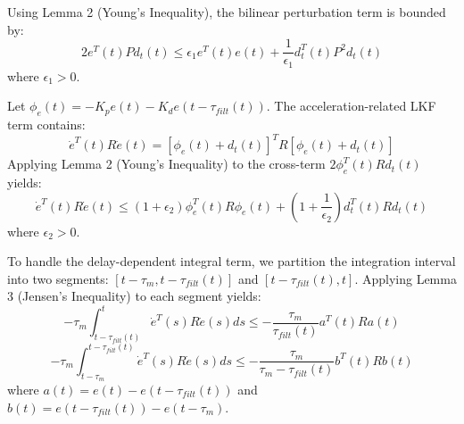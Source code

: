 \documentclass[letterpaper,journal]{IEEEtran}
\begin{document}
Using Lemma 2 (Young's Inequality), the bilinear perturbation term is bounded by:
\begin{equation}
2 e^T(t) P d_t(t) \le \epsilon_1 e^T(t) e(t) + \frac{1}{\epsilon_1} d_t^T(t) P^2 d_t(t)
\end{equation}
where $\epsilon_1 > 0$.

Let $\phi_e(t) = -K_p e(t) - K_d e(t - \tau_{filt}(t))$. The acceleration-related LKF term contains:
\begin{equation}
\dot{e}^T(t) R \dot{e}(t) = \left[ \phi_e(t) + d_t(t) \right]^T R \left[ \phi_e(t) + d_t(t) \right]
\end{equation}
Applying Lemma 2 (Young's Inequality) to the cross-term $2 \phi_e^T(t) R d_t(t)$ yields:
\begin{equation}
\dot{e}^T(t) R \dot{e}(t) \le (1 + \epsilon_2) \phi_e^T(t) R \phi_e(t) + \left( 1 + \frac{1}{\epsilon_2} \right) d_t^T(t) R d_t(t)
\end{equation}
where $\epsilon_2 > 0$.

To handle the delay-dependent integral term, we partition the integration interval into two segments: $[t - \tau_m, t - \tau_{filt}(t)]$ and $[t - \tau_{filt}(t), t]$. Applying Lemma 3 (Jensen's Inequality) to each segment yields:
\begin{equation}
-\tau_m \int_{t - \tau_{filt}(t)}^{t} \dot{e}^T(s) R \dot{e}(s) ds \le -\frac{\tau_m}{\tau_{filt}(t)} a^T(t) R a(t)
\end{equation}
\begin{equation}
-\tau_m \int_{t - \tau_m}^{t-\tau_{filt}(t)} \dot{e}^T(s) R \dot{e}(s) ds \le -\frac{\tau_m}{\tau_m - \tau_{filt}(t)} b^T(t) R b(t)
\end{equation}
where $a(t) = e(t) - e(t-\tau_{filt}(t))$ and $b(t) = e(t-\tau_{filt}(t)) - e(t-\tau_m)$.
\end{document}
